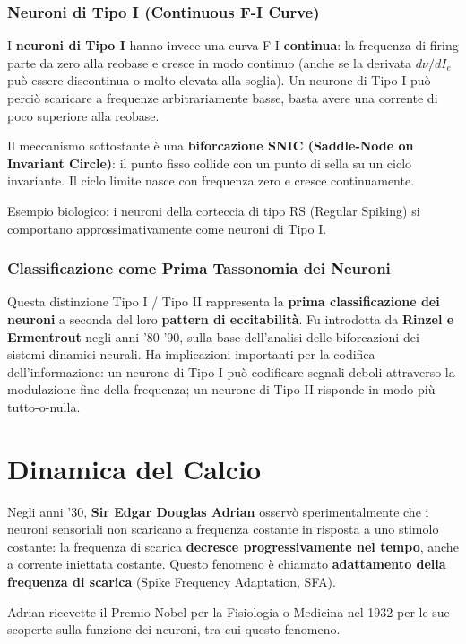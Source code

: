 \subsubsection{Neuroni di Tipo I (Continuous F-I Curve)}

I \textbf{neuroni di Tipo I} hanno invece una curva F-I \textbf{continua}: la frequenza di firing parte da zero alla reobase e cresce in modo continuo (anche se la derivata $d\nu/dI_e$ può essere discontinua o molto elevata alla soglia). Un neurone di Tipo I può perciò scaricare a frequenze arbitrariamente basse, basta avere una corrente di poco superiore alla reobase.

Il meccanismo sottostante è una \textbf{biforcazione SNIC (Saddle-Node on Invariant Circle)}: il punto fisso collide con un punto di sella su un ciclo invariante. Il ciclo limite nasce con frequenza zero e cresce continuamente.

Esempio biologico: i neuroni della corteccia di tipo RS (Regular Spiking) si comportano approssimativamente come neuroni di Tipo I.

\subsubsection{Classificazione come Prima Tassonomia dei Neuroni}

Questa distinzione Tipo I / Tipo II rappresenta la \textbf{prima classificazione dei neuroni} a seconda del loro \textbf{pattern di eccitabilità}. Fu introdotta da \textbf{Rinzel e Ermentrout} negli anni '80-'90, sulla base dell'analisi delle biforcazioni dei sistemi dinamici neurali. Ha implicazioni importanti per la codifica dell'informazione: un neurone di Tipo I può codificare segnali deboli attraverso la modulazione fine della frequenza; un neurone di Tipo II risponde in modo più tutto-o-nulla.


\section{Dinamica del Calcio}


Negli anni '30, \textbf{Sir Edgar Douglas Adrian} osservò sperimentalmente che i neuroni sensoriali non scaricano a frequenza costante in risposta a uno stimolo costante: la frequenza di scarica \textbf{decresce progressivamente nel tempo}, anche a corrente iniettata costante. Questo fenomeno è chiamato \textbf{adattamento della frequenza di scarica} (Spike Frequency Adaptation, SFA).

Adrian ricevette il Premio Nobel per la Fisiologia o Medicina nel 1932 per le sue scoperte sulla funzione dei neuroni, tra cui questo fenomeno.

